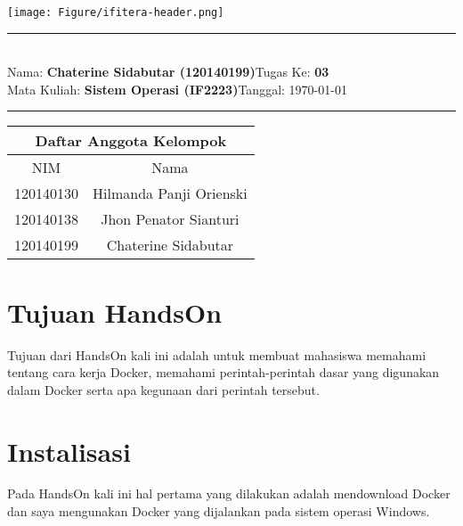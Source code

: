 \documentclass[11pt,a4paper]{article}
\newcommand{\stuid}{120140199}
\newcommand{\student}{\textbf{Chaterine Sidabutar (\stuid{})}}
\newcommand{\course}{\textbf{Sistem Operasi (IF2223)}}
\newcommand{\assignment}{\textbf{03}} %
\begin{document}
\thispagestyle{empty}
\begin{center}
	\texttt{[image: Figure/ifitera-header.png]}
	\vspace{0.1cm}
\end{center}
\noindent
{\large
\rule{17cm}{0.2cm}\\[0.3cm]
Nama: \student \hfill Tugas Ke: \assignment\\[0.1cm]
Mata Kuliah: \course \hfill Tanggal: \today\\
\rule{17cm}{0.05cm}
\vspace{0.1cm}
}



\begin{center}
\begin{tabular}{ |c|c| }
 \hline
 \multicolumn{2}{|c|}{\textbf{Daftar Anggota Kelompok}} \\
 \hline
 NIM & Nama \\
 \hline
 120140130 & Hilmanda Panji Orienski \\ 
 120140138 & Jhon Penator Sianturi \\ 
 120140199 & Chaterine Sidabutar \\
 \hline
\end{tabular}
\end{center}

\section{Tujuan HandsOn}
Tujuan dari HandsOn kali ini adalah untuk membuat mahasiswa memahami tentang cara kerja Docker, memahami perintah-perintah dasar yang digunakan dalam Docker serta apa kegunaan dari perintah tersebut.


\section{Instalisasi}
Pada HandsOn kali ini hal pertama yang dilakukan adalah mendownload Docker dan saya mengunakan Docker yang dijalankan pada sistem operasi Windows.
\end{document}

